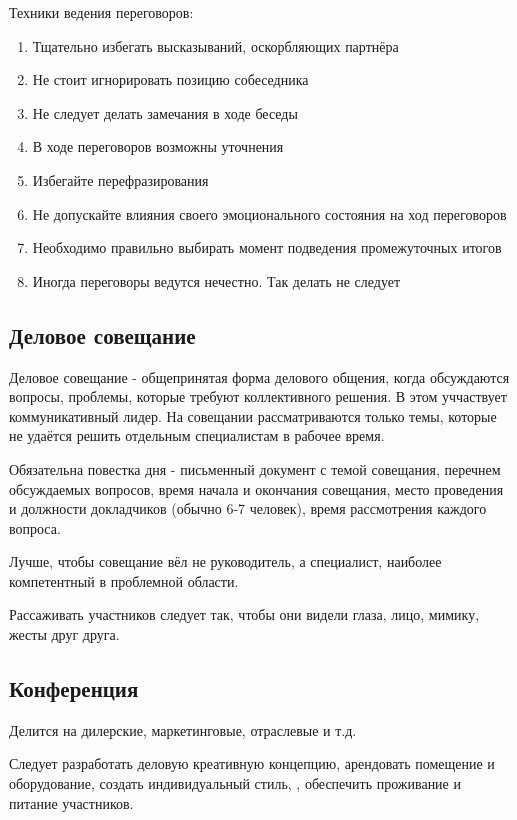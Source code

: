 Техники ведения переговоров:
\begin{enumerate}
    \item Тщательно избегать высказываний, оскорбляющих партнёра
    \item Не стоит игнорировать позицию собеседника
    \item Не следует делать замечания в ходе беседы
    \item В ходе переговоров возможны уточнения
    \item Избегайте перефразирования
    \item Не допускайте влияния своего эмоционального состояния на ход переговоров
    \item Необходимо правильно выбирать момент подведения промежуточных итогов
    \item Иногда переговоры ведутся нечестно. Так делать не следует
\end{enumerate}

\subsection{Деловое совещание}

Деловое совещание - общепринятая форма делового общения, когда обсуждаются вопросы, проблемы, которые требуют коллективного решения. В этом уччаствует коммуникативный лидер. На совещании рассматриваются только темы, которые не удаётся решить отдельным специалистам в рабочее время.

Обязательна повестка дня - письменный документ с темой совещания, перечнем обсуждаемых вопросов, время начала и окончания совещания, место проведения и должности докладчиков (обычно 6-7 человек), время рассмотрения каждого вопроса.

Лучше, чтобы совещание вёл не руководитель, а специалист, наиболее компетентный в проблемной области.

Рассаживать участников следует так, чтобы они видели глаза, лицо, мимику, жесты друг друга.

\subsection{Конференция}

Делится на дилерские, маркетинговые, отраслевые и т.д.

Следует разработать деловую креативную концепцию, арендовать помещение и оборудование, создать индивидуальный стиль, \missed{}, обеспечить проживание и питание участников.

